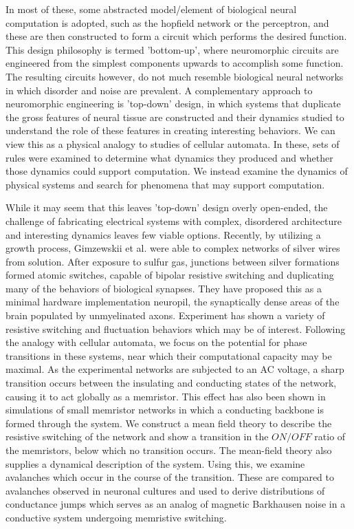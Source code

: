 \documentclass[aps,prl,preprint,groupedaddress]{revtex4-1}
\begin{document}
In most of these, some abstracted model/element of
biological neural computation is adopted, such as the hopfield network or the
perceptron, and these are then constructed to form a circuit which
performs the desired function.  This design philosophy is termed 'bottom-up',
where neuromorphic circuits are engineered from the simplest components
upwards to accomplish some function.  The resulting circuits however, do not
much resemble biological neural networks in which disorder and noise are
prevalent.  A complementary approach to neuromorphic engineering is 'top-down'
design, in which systems that duplicate the gross features of neural tissue
are constructed and their dynamics studied to understand the role of these
features in creating interesting behaviors.  We can view this as a physical
analogy to studies of cellular automata. In these, sets of rules were examined
to determine what dynamics they produced and whether those dynamics could
support computation.\cite{Langton1990}  We instead examine the dynamics of
physical systems and search for phenomena that may support computation.

While it may seem that this leaves 'top-down' design overly open-ended, the
challenge of fabricating electrical systems with complex, disordered
architecture and interesting dynamics leaves few viable options.  Recently, by
utilizing a growth process, Gimzewskii et al. were able to complex networks
of silver wires from solution.  After exposure to sulfur gas, junctions
between silver formations formed atomic switches, capable of bipolar resistive
switching and duplicating many of the behaviors of biological synapses.  They
have proposed this as a minimal hardware implementation neuropil, the
synaptically dense areas of the brain populated by unmyelinated axons.
Experiment has shown a variety of resistive switching and fluctuation
behaviors which may be of interest.  Following the analogy with cellular
automata, we focus on the potential for phase transitions in these systems,
near which their computational capacity may be maximal.  As the experimental
networks are subjected to an AC voltage, a sharp transition occurs between
the insulating and conducting states of the network, causing it to act
globally as a memristor.  This effect has also been shown in simulations of
small memristor networks in which a conducting backbone is formed through
the system.  We construct a mean field theory to describe the resistive
switching of the network and show a transition in the $ON/OFF$ ratio of
the memristors, below which no transition occurs.  The mean-field theory
also supplies a dynamical description of the system.  Using this, we examine
avalanches which occur in the course of the transition.  These are compared
to avalanches observed in neuronal cultures and used to derive distributions
of conductance jumps which serves as an analog of magnetic Barkhausen noise
in a conductive system undergoing memristive switching.
\end{document}
